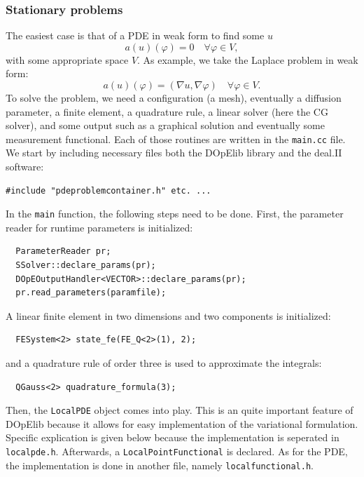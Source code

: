\documentclass[prodmode,acmtoms]{acmsmall}
\numberwithin{equation}{section}
\renewcommand{\phi}{\varphi}
\begin{document}
\subsubsection{Stationary problems}
The easiest case 
is that of a PDE in weak form to find some $u$
\[
a(u)(\phi) = 0 \quad \forall \phi \in V,
\]
with some appropriate space $V$. As example, we take 
the Laplace problem in weak form:
\[
a(u)(\phi) = (\nabla u, \nabla \phi) \quad \forall \phi \in V.
\]
To solve the problem, we need a configuration (a mesh), eventually 
a diffusion parameter, a finite element, a quadrature rule,
a linear solver (here the CG solver), and some output such as
a graphical solution and eventually some measurement functional.
Each of those routines are written in the \texttt{main.cc} file. 
We start by including necessary files both the DOpElib library and
the deal.II software:
\begin{lstlisting}
#include "pdeproblemcontainer.h" etc. ...
\end{lstlisting}
In the \texttt{main} function, the following steps need to be done. First, 
the parameter reader for runtime parameters is initialized:
\begin{lstlisting}
  ParameterReader pr;
  SSolver::declare_params(pr);
  DOpEOutputHandler<VECTOR>::declare_params(pr);
  pr.read_parameters(paramfile);
\end{lstlisting}
A linear finite element in two dimensions and two components is 
initialized:
\begin{lstlisting}
  FESystem<2> state_fe(FE_Q<2>(1), 2);
\end{lstlisting}
and a quadrature rule of order three is used to approximate the 
integrals:
\begin{lstlisting}
  QGauss<2> quadrature_formula(3);
\end{lstlisting}
Then, the \texttt{LocalPDE} object comes into play. This is an quite 
important feature of DOpElib because it allows for easy implementation 
of the variational formulation. Specific explication is given below because
the implementation is seperated in \texttt{localpde.h}.
Afterwards, a \texttt{LocalPointFunctional} is declared. As for the PDE, the 
implementation is done in another file, namely \texttt{localfunctional.h}.
\end{document}
